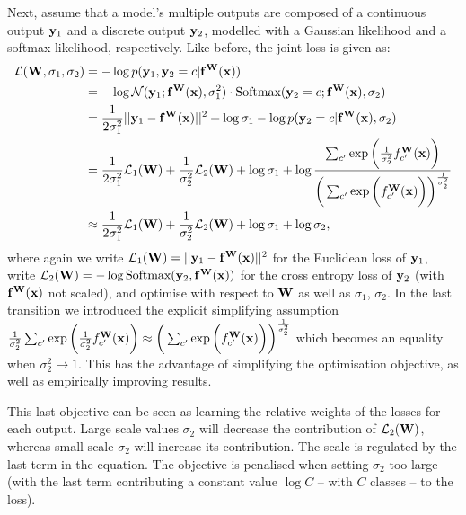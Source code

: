Next, assume that a model's multiple outputs are composed of a continuous output $\mathbf{y}_1$ and a discrete output $\mathbf{y}_2$, modelled with a Gaussian likelihood and a softmax likelihood, respectively. Like before, the joint loss is given as:
\begin{equation}
\begin{aligned}
\mathcal{L}(\mathbf{W}, \sigma_1, \sigma_2) &= 
-\log p(\mathbf{y}_1, \mathbf{y}_2=c | \mathbf{f}^{\mathbf{W}}(\mathbf{x})) \\
&= 
-\log \mathcal{N}(\mathbf{y}_1; \mathbf{f}^{\mathbf{W}}(\mathbf{x}), \sigma_1^2) \cdot
\text{Softmax}(\mathbf{y}_2=c; \mathbf{f}^{\mathbf{W}}(\mathbf{x}), \sigma_2) \\
&=
\frac{1}{2 \sigma_1^2} ||\mathbf{y}_1 - \mathbf{f}^{\mathbf{W}}(\mathbf{x})||^2
+ \log \sigma_1
- \log p(\mathbf{y}_2 = c | \mathbf{f}^{\mathbf{W}}(\mathbf{x}), \sigma_2)
 \\
&= \frac{1}{2 \sigma_1^2} \mathcal{L}_1(\mathbf{W}) 
+ \frac{1}{\sigma_2^2} \mathcal{L}_2(\mathbf{W})
+ \log \sigma_1 
+ \log \frac{
\sum_{c'} \exp \bigg( \frac{1}{\sigma_2^2} f^{\mathbf{W}}_{c'}(\mathbf{x}) \bigg)
}{
\bigg( \sum_{c'} \exp \bigg( f^{\mathbf{W}}_{c'}(\mathbf{x}) \bigg) \bigg)^{\frac{1}{\sigma_2^2} }
}
\\
&\approx \frac{1}{2 \sigma_1^2} \mathcal{L}_1(\mathbf{W}) 
+ \frac{1}{\sigma_2^2} \mathcal{L}_2(\mathbf{W})
+ \log \sigma_1
+ \log \sigma_2,
\end{aligned}
\end{equation}
where again we write $\mathcal{L}_1(\mathbf{W}) = ||\mathbf{y}_1 - \mathbf{f}^{\mathbf{W}}(\mathbf{x})||^2$ for the Euclidean loss of $\mathbf{y}_1$, write $\mathcal{L}_2(\mathbf{W}) = -\log \text{Softmax} (\mathbf{y}_2, \mathbf{f}^{\mathbf{W}}(\mathbf{x}))$ for the cross entropy loss of $\mathbf{y}_2$ (with $\mathbf{f}^{\mathbf{W}}(\mathbf{x})$ not scaled), and optimise with respect to $\mathbf{W}$ as well as $\sigma_1$, $\sigma_2$.
In the last transition we introduced the explicit simplifying assumption $\frac{1}{\sigma_2^2} \sum_{c'} \exp \bigg( \frac{1}{\sigma_2^2} f^{\mathbf{W}}_{c'}(\mathbf{x}) \bigg) \approx \bigg( \sum_{c'} \exp \bigg( f^{\mathbf{W}}_{c'}(\mathbf{x}) \bigg) \bigg)^{\frac{1}{\sigma_2^2} }$ which becomes an equality when $\sigma_2^2 \rightarrow 1$. This has the advantage of simplifying the optimisation objective, as well as empirically improving results.

This last objective can be seen as learning the relative weights of the losses for each output. Large scale values $\sigma_2$ will decrease the contribution of $\mathcal{L}_2(\mathbf{W})$, whereas small scale $\sigma_2$ will increase its contribution. The scale is regulated by the last term in the equation. The objective is penalised when setting $\sigma_2$ too large (with the last term contributing a constant value $\log C$ -- with $C$ classes -- to the loss). 

